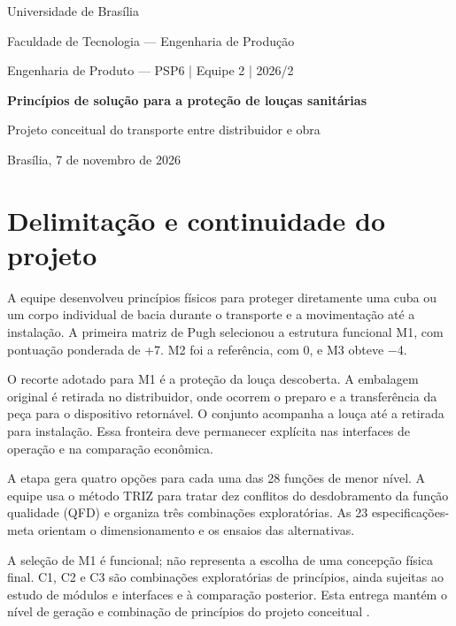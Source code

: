 \begin{center}
{\normalsize Universidade de Brasília\par}
{\small Faculdade de Tecnologia — Engenharia de Produção\par}
{\small Engenharia de Produto — PSP6 | Equipe 2 | 2026/2\par}
\vspace{0.6cm}
{\large\bfseries Princípios de solução para a proteção de louças sanitárias\par}
\vspace{0.15cm}
{\normalsize Projeto conceitual do transporte entre distribuidor e obra\par}
\vspace{0.2cm}
{\small Brasília, 7 de novembro de 2026\par}
\end{center}
\vspace{0.25cm}
\section{Delimitação e continuidade do projeto}
A equipe desenvolveu princípios físicos para proteger diretamente uma cuba ou um corpo individual de bacia durante o transporte e a movimentação até a instalação. A primeira matriz de Pugh selecionou a estrutura funcional M1, com pontuação ponderada de +7. M2 foi a referência, com 0, e M3 obteve \( - \)4.

O recorte adotado para M1 é a proteção da louça descoberta. A embalagem original é retirada no distribuidor, onde ocorrem o preparo e a transferência da peça para o dispositivo retornável. O conjunto acompanha a louça até a retirada para instalação. Essa fronteira deve permanecer explícita nas interfaces de operação e na comparação econômica.

A etapa gera quatro opções para cada uma das 28 funções de menor nível. A equipe usa o método TRIZ para tratar dez conflitos do desdobramento da função qualidade (QFD) e organiza três combinações exploratórias. As 23 especificações-meta orientam o dimensionamento e os ensaios das alternativas.

A seleção de M1 é funcional; não representa a escolha de uma concepção física final. C1, C2 e C3 são combinações exploratórias de princípios, ainda sujeitas ao estudo de módulos e interfaces e à comparação posterior. Esta entrega mantém o nível de geração e combinação de princípios do projeto conceitual \citep[cap.~6]{back2008}.

